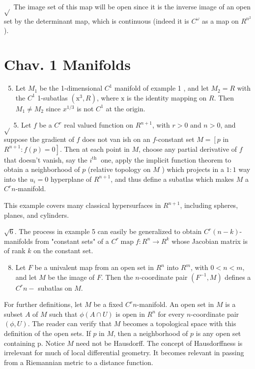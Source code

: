 \documentclass[10pt]{article}
\begin{document}
$\sqrt{ }$ The image set of this map will be open since it is the inverse image of an open set by the determinant map, which is continuous (indeed it is $C^{\omega}$ as a map on $R^{n^{2}}$ ).

\section{Chav. 1 Manifolds}
\begin{enumerate}
  \setcounter{enumi}{4}
  \item Let $M_{1}$ be the 1-dimensional $C^{1}$ manifold of example 1 , and let $M_{2}=R$ with the $C^{1}$ 1-subatlas $\left(\mathrm{x}^{3}, R\right)$, where $\mathrm{x}$ is the identity mapping on $R$. Then $M_{1} \neq M_{2}$ since $x^{1 / 3}$ is not $C^{1}$ at the origin.
\end{enumerate}
$\sqrt{ }$ 5. Let $f$ be a $C^{r}$ real valued function on $R^{n+1}$, with $r>0$ and $n>0$, and suppose the gradient of $f$ does not van ish on an $f$-constant set $M=\left[p\right.$ in $\left.R^{n+1}: f(p)=0\right]$. Then at each point in $M$, choose any partial derivative of $f$ that doesn't vanish, say the $i^{\text {th }}$ one, apply the implicit function theorem to obtain a neighborhood of $p$ (relative topology on $M$ ) which projects in a $1: 1$ way into the $u_{i}=0$ hyperplane of $R^{n+1}$, and thus define a subatlas which makes $M$ a $C^{r} n$-manifold.

This example covers many classical hypersurfaces in $R^{n+1}$, including spheres, planes, and cylinders.

$\sqrt{6}$. The process in example 5 can easily be generalized to obtain $C^{r}(n-k)$-manifolds from "constant sets" of a $C^{r} \operatorname{map} f: R^{n} \rightarrow R^{k}$ whose Jacobian matrix is of rank $k$ on the constant set.

\begin{enumerate}
  \setcounter{enumi}{7}
  \item Let $F$ be a univalent map from an open set in $R^{n}$ into $R^{m}$, with $0<n<m$, and let $M$ be the image of $F$. Then the $n$-coordinate pair $\left(F^{-1}, M\right)$ defines a $C^{r} n-$ subatlas on $M$.
\end{enumerate}
For further definitions, let $M$ be a fixed $C^{r} n$-manifold. An open set in $M$ is a subset $A$ of $M$ such that $\phi(A \cap U)$ is open in $R^{n}$ for every $n$-coordinate pair $(\phi, U)$. The reader can verify that $M$ becomes a topological space with this definition of the open sets. If $p$ in $M$, then a neighborhood of $p$ is any open set containing p. Notice $M$ need not be Hausdorff. The concept of Hausdorffness is irrelevant for much of local differential geometry. It becomes relevant in passing from a Riemannian metric to a distance function.
\end{document}
